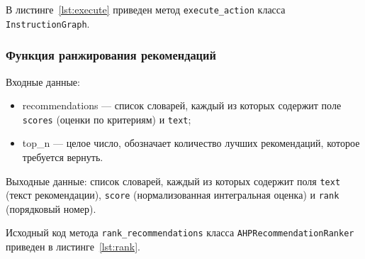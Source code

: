 В листинге~\ref{lst:execute} приведен метод \texttt{execute\_action} класса \texttt{InstructionGraph}.


\subsubsection{Функция ранжирования рекомендаций}

Входные данные:
\begin{itemize}
    \item recommendations --- список словарей, каждый из которых содержит поле \texttt{scores} (оценки по критериям) и \texttt{text};
    \item top\_n --- целое число, обозначает количество лучших рекомендаций, которое требуется вернуть.
\end{itemize}

Выходные данные: список словарей, каждый из которых содержит поля \texttt{text} (текст рекомендации), \texttt{score} (нормализованная интегральная оценка) и \texttt{rank} (порядковый номер).

Исходный код метода \texttt{rank\_recommendations} класса \texttt{AHPRecommendationRanker} приведен в листинге~\ref{lst:rank}.


